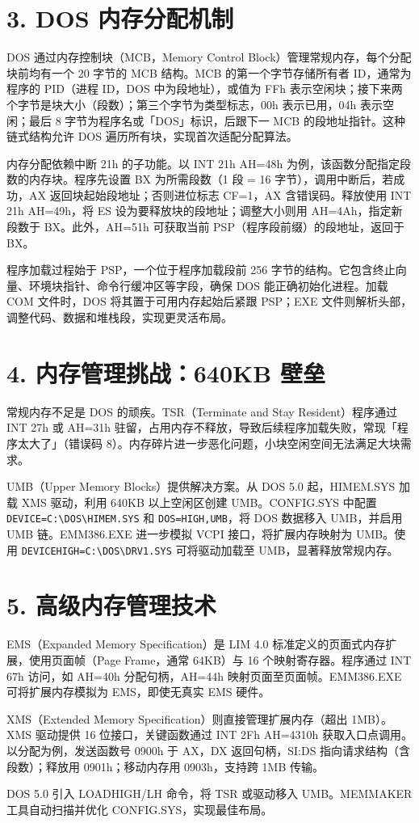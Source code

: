 \chapter{3. DOS 内存分配机制}
DOS 通过内存控制块（MCB，Memory Control Block）管理常规内存，每个分配块前均有一个 20 字节的 MCB 结构。MCB 的第一个字节存储所有者 ID，通常为程序的 PID（进程 ID，DOS 中为段地址），或值为 FFh 表示空闲块；接下来两个字节是块大小（段数）；第三个字节为类型标志，00h 表示已用，04h 表示空闲；最后 8 字节为程序名或「DOS」标识，后跟下一 MCB 的段地址指针。这种链式结构允许 DOS 遍历所有块，实现首次适配分配算法。\par
内存分配依赖中断 21h 的子功能。以 INT 21h AH=48h 为例，该函数分配指定段数的内存块。程序先设置 BX 为所需段数（1 段 = 16 字节），调用中断后，若成功，AX 返回块起始段地址；否则进位标志 CF=1，AX 含错误码。释放使用 INT 21h AH=49h，将 ES 设为要释放块的段地址；调整大小则用 AH=4Ah，指定新段数于 BX。此外，AH=51h 可获取当前 PSP（程序段前缀）的段地址，返回于 BX。\par
程序加载过程始于 PSP，一个位于程序加载段前 256 字节的结构。它包含终止向量、环境块指针、命令行缓冲区等字段，确保 DOS 能正确初始化进程。加载 COM 文件时，DOS 将其置于可用内存起始后紧跟 PSP；EXE 文件则解析头部，调整代码、数据和堆栈段，实现更灵活布局。\par
\chapter{4. 内存管理挑战：640KB 壁垒}
常规内存不足是 DOS 的顽疾。TSR（Terminate and Stay Resident）程序通过 INT 27h 或 AH=31h 驻留，占用内存不释放，导致后续程序加载失败，常现「程序太大了」（错误码 8）。内存碎片进一步恶化问题，小块空闲空间无法满足大块需求。\par
UMB（Upper Memory Blocks）提供解决方案。从 DOS 5.0 起，HIMEM.SYS 加载 XMS 驱动，利用 640KB 以上空闲区创建 UMB。CONFIG.SYS 中配置 \texttt{DEVICE=C:\textbackslash{}DOS\textbackslash{}HIMEM.SYS} 和 \texttt{DOS=HIGH,UMB}，将 DOS 数据移入 UMB，并启用 UMB 链。EMM386.EXE 进一步模拟 VCPI 接口，将扩展内存映射为 UMB。使用 \texttt{DEVICEHIGH=C:\textbackslash{}DOS\textbackslash{}DRV1.SYS} 可将驱动加载至 UMB，显著释放常规内存。\par
\chapter{5. 高级内存管理技术}
EMS（Expanded Memory Specification）是 LIM 4.0 标准定义的页面式内存扩展，使用页面帧（Page Frame，通常 64KB）与 16 个映射寄存器。程序通过 INT 67h 访问，如 AH=40h 分配句柄，AH=44h 映射页面至页面帧。EMM386.EXE 可将扩展内存模拟为 EMS，即使无真实 EMS 硬件。\par
XMS（Extended Memory Specification）则直接管理扩展内存（超出 1MB）。XMS 驱动提供 16 位接口，关键函数通过 INT 2Fh AH=4310h 获取入口点调用。以分配为例，发送函数号 0900h 于 AX，DX 返回句柄，SI:DS 指向请求结构（含段数）；释放用 0901h；移动内存用 0903h，支持跨 1MB 传输。\par
DOS 5.0 引入 LOADHIGH/LH 命令，将 TSR 或驱动移入 UMB。MEMMAKER 工具自动扫描并优化 CONFIG.SYS，实现最佳布局。\par
